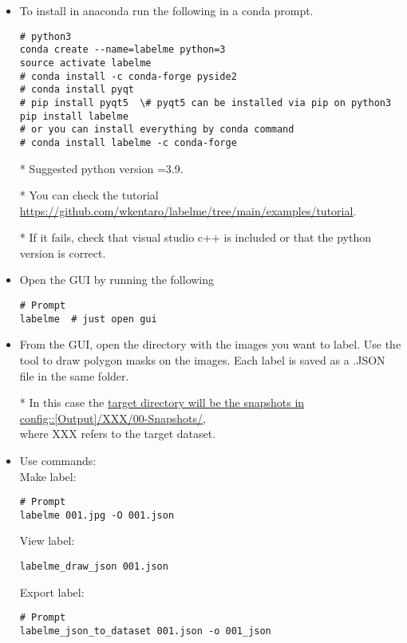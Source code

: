 \documentclass{foxelas_report}
\begin{document}
\begin{enumerate}
\begin{itemize}
\item To install in anaconda run the following in a conda prompt.\\

\begin{lstlisting}
# python3
conda create --name=labelme python=3
source activate labelme
# conda install -c conda-forge pyside2
# conda install pyqt
# pip install pyqt5  \# pyqt5 can be installed via pip on python3
pip install labelme
# or you can install everything by conda command
# conda install labelme -c conda-forge
\end{lstlisting}



* Suggested python version =3.9. 

* You can check the tutorial \url{https://github.com/wkentaro/labelme/tree/main/examples/tutorial}.

* If it fails, check that visual studio c++ is included or that the python version is correct. 


\item Open the GUI by running the following \\
\begin{lstlisting}
# Prompt
labelme  # just open gui
\end{lstlisting}

\item From the GUI, open the directory with the images you want to label. Use the tool to draw polygon masks on the images. Each label is saved as a .JSON file in the same folder. 

* In this case the \underline{target directory will be the snapshots in}\\
\underline{config::[Output]/XXX/00-Snapshots/},\\ where XXX refers to the target dataset.

\item Use commands: \\
Make label: 
\begin{lstlisting}
# Prompt
labelme 001.jpg -O 001.json 
\end{lstlisting}

View label: 
\begin{lstlisting}
labelme_draw_json 001.json
\end{lstlisting}

Export label:
\begin{lstlisting}
# Prompt
labelme_json_to_dataset 001.json -o 001_json
\end{lstlisting}



\end{itemize}
\end{enumerate}
\end{document}
